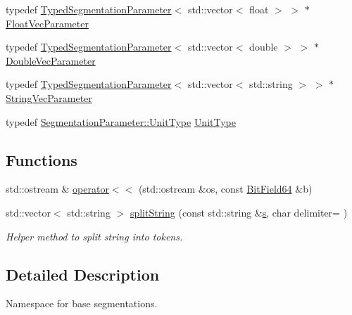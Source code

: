 \begin{DoxyCompactItemize}
\item 
typedef \hyperlink{class_d_d4hep_1_1_d_d_segmentation_1_1_typed_segmentation_parameter}{Typed\+Segmentation\+Parameter}$<$ std\+::vector$<$ float $>$ $>$ $\ast$ \hyperlink{namespace_d_d4hep_1_1_d_d_segmentation_ab7445ed6131fb76c39c0c2463062d95e}{Float\+Vec\+Parameter}
\item 
typedef \hyperlink{class_d_d4hep_1_1_d_d_segmentation_1_1_typed_segmentation_parameter}{Typed\+Segmentation\+Parameter}$<$ std\+::vector$<$ double $>$ $>$ $\ast$ \hyperlink{namespace_d_d4hep_1_1_d_d_segmentation_ae7964d33264473a9df6cfb5194cfb740}{Double\+Vec\+Parameter}
\item 
typedef \hyperlink{class_d_d4hep_1_1_d_d_segmentation_1_1_typed_segmentation_parameter}{Typed\+Segmentation\+Parameter}$<$ std\+::vector$<$ std\+::string $>$ $>$ $\ast$ \hyperlink{namespace_d_d4hep_1_1_d_d_segmentation_a6560c8ed740be64475f81e890aaa58b2}{String\+Vec\+Parameter}
\item 
typedef \hyperlink{class_d_d4hep_1_1_d_d_segmentation_1_1_segmentation_parameter_a36f5f8b8d812b2a2b81363377565d8d4}{Segmentation\+Parameter\+::\+Unit\+Type} \hyperlink{namespace_d_d4hep_1_1_d_d_segmentation_a416c3e3ca0d578410085897700ab29dc}{Unit\+Type}
\end{DoxyCompactItemize}
\subsection*{Functions}
\begin{DoxyCompactItemize}
\item 
std\+::ostream \& \hyperlink{namespace_d_d4hep_1_1_d_d_segmentation_a113bdacd047bf42526854d70d3d8ff8b}{operator$<$$<$} (std\+::ostream \&os, const \hyperlink{class_d_d4hep_1_1_d_d_segmentation_1_1_bit_field64}{Bit\+Field64} \&b)
\item 
std\+::vector$<$ std\+::string $>$ \hyperlink{namespace_d_d4hep_1_1_d_d_segmentation_a74ba39ad0902cab359c0022d295ffb99}{split\+String} (const std\+::string \&\hyperlink{_volumes_8cpp_a17ca6bfc8040d695d3cada22a4763d40}{s}, char delimiter=\textquotesingle{} \textquotesingle{})
\begin{DoxyCompactList}\small\item\em Helper method to split string into tokens. \end{DoxyCompactList}\end{DoxyCompactItemize}


\subsection{Detailed Description}
Namespace for base segmentations. 

